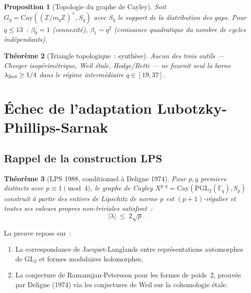 \documentclass[11pt,a4paper]{article}
\newtheorem{theorem}{Théorème}[section]
\newtheorem{proposition}[theorem]{Proposition}
\theoremstyle{definition}
\newcommand{\Z}{\mathbb{Z}}
\newcommand{\F}{\mathbb{F}}
\newcommand{\Cay}{\mathrm{Cay}}
\newcommand{\PGL}{\mathrm{PGL}}
\newcommand{\GL}{\mathrm{GL}}
\begin{document}
\begin{proposition}[Topologie du graphe de Cayley]
\label{prop:betti}
Soit $G_q = \Cay((\Z/m_q\Z)^\times, S_q)$ avec $S_q$ le support de la
distribution des gaps. Pour $q\leq 13$~:
$\beta_0 = 1$ (connexité), $\beta_1 \sim q^2$
(croissance quadratique du nombre de cycles indépendants).
\end{proposition}

\begin{theorem}[Triangle topologique~: synthèse]
\label{thm:topo_triangle}
Aucun des trois outils — Cheeger isopérimétrique, Weil étale,
Hodge/Betti — ne fournit \emph{seul} la borne $\lambda_{\rm 2nd}\geq 1/4$
dans le régime intermédiaire $q\in[19,37]$.
\end{theorem}

\section{Échec de l'adaptation Lubotzky-Phillips-Sarnak}
\label{sec:lps}

\subsection{Rappel de la construction LPS}

\begin{theorem}[LPS 1988, conditionnel à Deligne 1974]
\label{thm:lps}
Pour $p,q$ premiers distincts avec $p\equiv 1\pmod 4$, le graphe de
Cayley
$X^{p,q} = \Cay(\PGL_2(\F_q), S_p)$
construit à partir des entiers de Lipschitz de norme $p$ est
$(p+1)$-régulier et toutes ses valeurs propres non-triviales
satisfont~:
\begin{equation}
  |\lambda| \;\leq\; 2\sqrt p.
\end{equation}
\end{theorem}

La preuve repose sur~:
\begin{enumerate}
  \item La correspondance de Jacquet-Langlands entre représentations
        automorphes de $\GL_2$ et formes modulaires holomorphes,
  \item La conjecture de Ramanujan-Petersson pour les formes de
        poids~$2$, prouvée par Deligne (1974) via les conjectures de
        Weil sur la cohomologie étale.
\end{enumerate}
\end{document}
